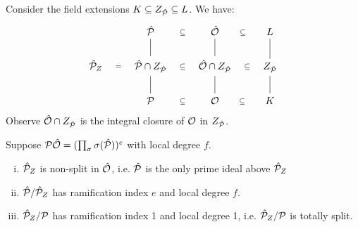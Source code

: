 Consider the field extensions $K \subseteq Z_{\hat{\mathcal{P}}} \subseteq L$. We have:\\
\[ \begin{tikzcd}
 &	\hP	\arrow[draw=none]{r}[sloped,auto=false]{\subseteq} & \hO \arrow[draw=none]{r}[sloped,auto=false]{\subseteq} & L\\
 \hP_Z \arrow[draw=none]{r}[sloped,auto=false]{=} & \hP \cap \ZP \arrow[dash]{u} \arrow[draw=none]{r}[sloped,auto=false]{\subseteq} &\hO\cap \ZP \arrow[dash]{u} \arrow[draw=none]{r}[sloped,auto=false]{\subseteq} & \ZP \arrow[dash]{u} \\
 & \PP \arrow[dash]{u} \arrow[draw=none]{r}[sloped,auto=false]{\subseteq} & \O \arrow[dash]{u} \arrow[draw=none]{r}[sloped,auto=false]{\subseteq} &K \arrow[dash]{u}
\end{tikzcd}
\]
Observe $\hat{\mathcal{O}} \cap Z_{\hat{\mathcal{P}}}$ is the integral closure of $\mathcal{O}$ in $Z_{\hat{\mathcal{P}}}$.

\begin{Prop}
Suppose $\mathcal{P} \hat{\mathcal{O}} = (\prod_\sigma \sigma(\hat{\mathcal{P}}))^e$ with local degree $f$.
\begin{enumerate}[i)]
\item $\hat{\mathcal{P}}_Z$ is non-split in $\hat{\mathcal{O}}$, i.e. $\hat{\mathcal{P}}$ is the only prime ideal above $\hat{\mathcal{P}}_Z$ 
\item $\hat{\mathcal{P}}/\hat{\mathcal{P}}_Z$ has ramification index $e$ and local degree $f$.
\item $\hat{\mathcal{P}}_Z/\mathcal{P}$ has ramification index 1 and local degree 1, i.e. $\hat{\mathcal{P}}_Z/\mathcal{P}$ is totally split.
\end{enumerate}
\end{Prop}

